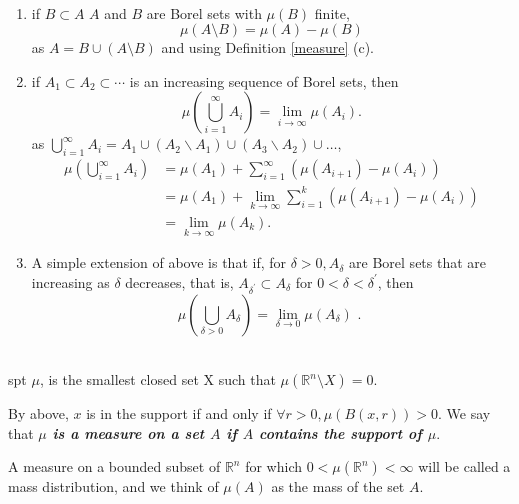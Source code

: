 \begin{property}[Measure]\label{propmeasure} $ $
\begin{enumerate}
    \item if $B\subset A$ $A$ and $B$ are Borel sets with $\mu(B)$ finite, 
    $$\mu(A\setminus B) = \mu(A) - \mu(B)$$ 
    as $A = B\cup(A\setminus B)$ and using Definition \ref{measure} (c).
    \item if $A_{1} \subset A_{2} \subset \cdots$ is an increasing sequence of Borel sets, then
    $$
    \mu\left(\bigcup_{i=1}^{\infty} A_{i}\right)=\lim _{i \rightarrow \infty} \mu\left(A_{i}\right) .
    $$
    as $\displaystyle\bigcup_{i=1}^{\infty} A_{i}=A_{1} \cup\left(A_{2} \backslash A_{1}\right) \cup\left(A_{3} \backslash A_{2}\right) \cup \dots$,
    $$\begin{aligned} \mu\left(\bigcup_{i=1}^{\infty} A_{i}\right) &=\mu\left(A_{1}\right)+\sum_{i=1}^{\infty}\left(\mu\left(A_{i+1}\right)-\mu\left(A_{i}\right)\right) \\ &=\mu\left(A_{1}\right)+\lim _{k \rightarrow \infty} \sum_{i=1}^{k}\left(\mu\left(A_{i+1}\right)-\mu\left(A_{i}\right)\right) \\ &=\lim _{k \rightarrow \infty} \mu\left(A_{k}\right) . \end{aligned}$$
    \item A simple extension of above is that if, for $\delta>0, A_{\delta}$ are Borel sets that are increasing as $\delta$ decreases, that is, $A_{\delta^{\prime}} \subset A_{\delta}$ for $0<\delta<\delta^{\prime}$, then
    $$
    \mu\left(\bigcup_{\delta>0} A_{\delta}\right)=\lim _{\delta \rightarrow 0} \mu\left(A_{\delta}\right) \text { . }
    $$
\end{enumerate}
\end{property}

\begin{definition}[Support of $\mu$] $ $\\
    spt $\mu$, is the smallest closed set X such that $\mu(\mathbb{R}^n\setminus X) = 0$. 
\end{definition}

By above, $x$ is in the support if and only if $\forall r > 0, \mu(B(x, r)) > 0$. We say that \textbf{\textit{$\mu$ is a measure on a set $A$ if $A$ contains the support of $\mu$}}.

\begin{definition}
    A measure on a bounded subset of $\mathbb{R}^{n}$ for which $0<\mu\left(\mathbb{R}^{n}\right)<\infty$ will be called a mass distribution, and we think of $\mu(A)$ as the mass of the set $A$.
\end{definition}

